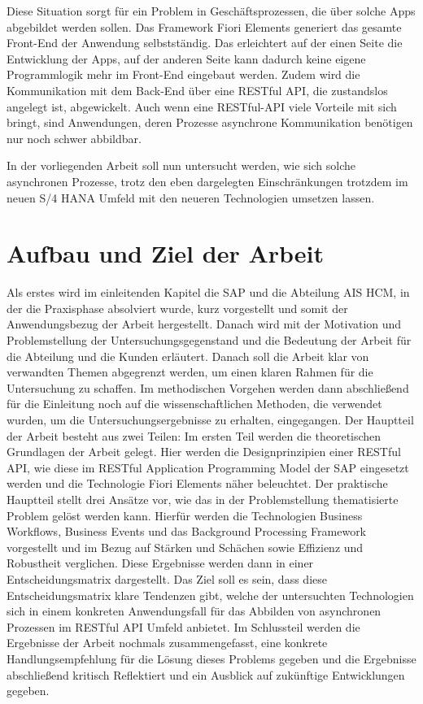 Diese Situation sorgt für ein Problem in Geschäftsprozessen, die über solche Apps abgebildet werden sollen. Das Framework Fiori Elements generiert das gesamte Front-End der Anwendung selbstständig. Das erleichtert auf der einen Seite die Entwicklung der Apps, auf der anderen Seite kann dadurch keine eigene Programmlogik mehr im Front-End eingebaut werden. Zudem wird die Kommunikation mit dem Back-End über eine RESTful API, die zustandslos angelegt ist, abgewickelt. Auch wenn eine RESTful-API viele Vorteile mit sich bringt, sind Anwendungen, deren Prozesse asynchrone Kommunikation benötigen nur noch schwer abbildbar.

In der vorliegenden Arbeit soll nun untersucht werden, wie sich solche asynchronen Prozesse, trotz den eben dargelegten Einschränkungen trotzdem im neuen S/4 HANA Umfeld mit den neueren Technologien umsetzen lassen.

\section{Aufbau und Ziel der Arbeit}

Als erstes wird im einleitenden Kapitel die SAP und die Abteilung AIS HCM, in der die Praxisphase absolviert wurde, kurz vorgestellt und somit der Anwendungsbezug der Arbeit hergestellt. Danach wird mit der Motivation und Problemstellung der Untersuchungsgegenstand und die Bedeutung der Arbeit für die Abteilung und die Kunden erläutert. Danach soll die Arbeit klar von verwandten Themen abgegrenzt werden, um einen klaren Rahmen für die Untersuchung zu schaffen. Im methodischen Vorgehen werden dann abschlie{\ss}end für die Einleitung noch auf die wissenschaftlichen Methoden, die verwendet wurden, um die Untersuchungsergebnisse zu erhalten, eingegangen. Der Hauptteil der Arbeit besteht aus zwei Teilen: Im ersten Teil werden die theoretischen Grundlagen der Arbeit gelegt. Hier werden die Designprinzipien einer RESTful API, wie diese im RESTful Application Programming Model der SAP eingesetzt werden und die Technologie Fiori Elements näher beleuchtet. Der praktische Hauptteil stellt drei Ansätze vor, wie das in der Problemstellung thematisierte Problem gelöst werden kann. Hierfür werden die Technologien Business Workflows, Business Events und das Background Processing Framework vorgestellt und im Bezug auf Stärken und Schächen sowie Effizienz und Robustheit verglichen. Diese Ergebnisse werden dann in einer Entscheidungsmatrix dargestellt. Das Ziel soll es sein, dass diese Entscheidungsmatrix klare Tendenzen gibt, welche der untersuchten Technologien sich in einem konkreten Anwendungsfall für das Abbilden von asynchronen Prozessen im RESTful API Umfeld anbietet. Im Schlussteil werden die Ergebnisse der Arbeit nochmals zusammengefasst, eine konkrete Handlungsempfehlung für die Lösung dieses Problems gegeben und die Ergebnisse abschlie{\ss}end kritisch Reflektiert und ein Ausblick auf zukünftige Entwicklungen gegeben.

